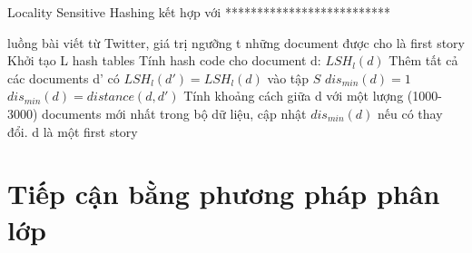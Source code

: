 	\begin{algorithm}[H]
		\caption{Locality Sensitive Hashing kết hợp với **************************}
		\begin{algorithmic}[1]
			\boldmath
			\REQUIRE luồng bài viết từ Twitter, giá trị ngưỡng t
			\ENSURE những document được cho là first story
			\State Khởi tạo L hash tables
					\State Tính hash code cho document d: $LSH_l(d)$
					\State Thêm tất cả các documents d' có $LSH_l(d') = LSH_l(d)$ vào tập $S$
				\ENDFOR
				\State $dis_{min}(d) = 1$
					\unboldmath
					\State $dis_{min}(d) = distance(d,d')$
					\ENDIF
				\ENDFOR
					\State Tính khoảng cách giữa d với một lượng (1000-3000) documents mới nhất trong bộ dữ liệu, cập nhật $dis_{min}(d)$ nếu có thay đổi.
				\ENDIF
					\STATE d là một first story
				\ENDIF
			\ENDFOR		
			
		\end{algorithmic}
	\end{algorithm}
	
\section{Tiếp cận bằng phương pháp phân lớp}